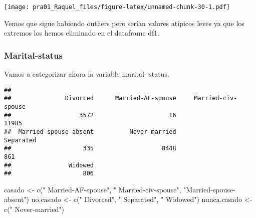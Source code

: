 \documentclass[]{article}
\newenvironment{Shaded}{\begin{snugshade}}{\end{snugshade}}
\newcommand{\DataTypeTok}[1]{\textcolor[rgb]{0.87,0.87,0.75}{#1}}
\newcommand{\FloatTok}[1]{\textcolor[rgb]{0.75,0.75,0.82}{#1}}
\newcommand{\KeywordTok}[1]{\textcolor[rgb]{0.94,0.87,0.69}{#1}}
\newcommand{\NormalTok}[1]{\textcolor[rgb]{0.80,0.80,0.80}{#1}}
\newcommand{\OperatorTok}[1]{\textcolor[rgb]{0.94,0.94,0.82}{#1}}
\newcommand{\StringTok}[1]{\textcolor[rgb]{0.80,0.58,0.58}{#1}}
\begin{document}
\begin{Shaded}
\end{Shaded}

\texttt{[image: pra01\_Raquel\_files/figure-latex/unnamed-chunk-30-1.pdf]}

Vemos que sigue habiendo outliers pero serían valores atípicos leves ya
que los extremos los hemos eliminado en el dataframe df1.

\hypertarget{marital-status}{%
\subsubsection{Marital-status}\label{marital-status}}

Vamos a categorizar ahora la variable marital- status.

\begin{Shaded}
\end{Shaded}

\begin{verbatim}
## 
##               Divorced      Married-AF-spouse     Married-civ-spouse 
##                   3572                     16                  11985 
##  Married-spouse-absent          Never-married              Separated 
##                    335                   8448                    861 
##                Widowed 
##                    806
\end{verbatim}

\begin{Shaded}
\begin{Highlighting}[]
\NormalTok{casado \textless{}{-}}\StringTok{ }\KeywordTok{c}\NormalTok{(}\StringTok{" Married{-}AF{-}spouse"}\NormalTok{, }\StringTok{" Married{-}civ{-}spouse"}\NormalTok{, }\StringTok{"Married{-}spouse{-}absent"}\NormalTok{)}
\NormalTok{no.casado \textless{}{-}}\StringTok{ }\KeywordTok{c}\NormalTok{(}\StringTok{" Divorced"}\NormalTok{, }\StringTok{" Separated"}\NormalTok{, }\StringTok{" Widowed"}\NormalTok{)}
\NormalTok{nunca.casado \textless{}{-}}\StringTok{ }\KeywordTok{c}\NormalTok{(}\StringTok{" Never{-}married"}\NormalTok{)}
\end{Highlighting}
\end{Shaded}
\end{document}
